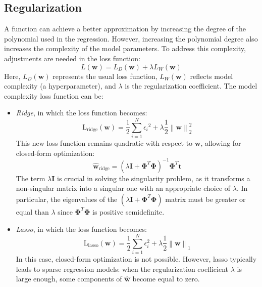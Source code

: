 \subsection{Regularization}
A function can achieve a better approximation by increasing the degree of the polynomial used in the regression.
However, increasing the polynomial degree also increases the complexity of the model parameters.
To address this complexity, adjustments are needed in the loss function:
\[L(\mathbf{w})=L_D(\mathbf{w})+\lambda L_W(\mathbf{w})\]
Here, $L_D(\mathbf{w})$ represents the usual loss function, $L_W(\mathbf{w})$ reflects model complexity (a hyperparameter), and $\lambda$ is the regularization coefficient.
The model complexity loss function can be: 
\begin{itemize}
    \item \textit{Ridge}, in which the loss function becomes: 
        \[\text{L}_{\text{ridge}}(\mathbf{w})=\dfrac{1}{2}\sum_{i=1}^N {\epsilon_i}^2 + \lambda\dfrac{1}{2}{\left\lVert \mathbf{w} \right\rVert}_2^2\]
        This new loss function remains quadratic with respect to $\mathbf{w}$, allowing for closed-form optimization:
        \[\hat{\mathbf{w}}_{\text{ridge}}={\left( \lambda\mathbf{I}+\boldsymbol{\Phi}^T \boldsymbol{\Phi} \right)}^{-1}\boldsymbol{\Phi}^T\mathbf{t}\]
        The term $\lambda\mathbf{I}$ is crucial in solving the singularity problem, as it transforms a non-singular matrix into a singular one with an appropriate choice of $\lambda$.
        In particular, the eigenvalues of the $\left( \lambda\mathbf{I}+\boldsymbol{\Phi}^T \boldsymbol{\Phi} \right)$ matrix must be greater or equal than $\lambda$ since $\boldsymbol{\Phi}^T \boldsymbol{\Phi}$ is positive semidefinite. 
    \item \textit{Lasso}, in which the loss function becomes: 
        \[\text{L}_{\text{lasso}}(\mathbf{w})=\dfrac{1}{2}\sum_{i=1}^N \epsilon_i^2 + \lambda\dfrac{1}{2}{\left\lVert \mathbf{w} \right\rVert}_1\]
        In this case, closed-form optimization is not possible. 
        However, lasso typically leads to sparse regression models: when the regularization coefficient $\lambda$ is large enough, some components of $\hat{\mathbf{w}}$ become equal to zero.
\end{itemize}

